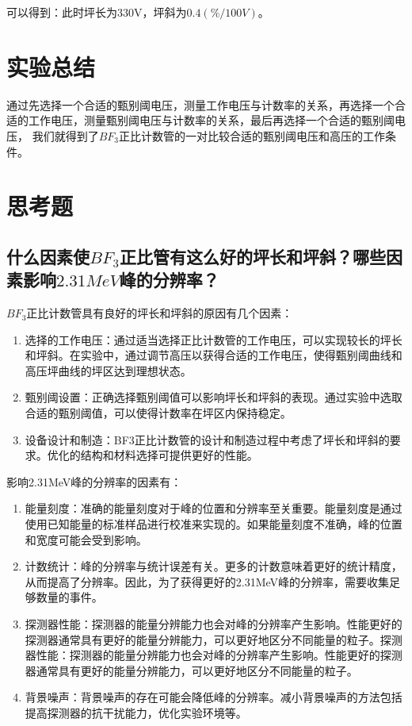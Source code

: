\documentclass[a4paper,UTF8]{ctexart}
\begin{document}
可以得到：此时坪长为330V，坪斜为$0.4(\%/100V)$。

\section{实验总结}

通过先选择一个合适的甄别阈电压，测量工作电压与计数率的关系，再选择一个合适的工作电压，测量甄别阈电压与计数率的关系，最后再选择一个合适的甄别阈电压，
我们就得到了$BF_3$正比计数管的一对比较合适的甄别阈电压和高压的工作条件。

\section{思考题}

\subsection{什么因素使$BF_3$正比管有这么好的坪长和坪斜？哪些因素影响$2.31MeV$峰的分辨率？}

$BF_3$正比计数管具有良好的坪长和坪斜的原因有几个因素：
\begin{enumerate}
    \item 选择的工作电压：通过适当选择正比计数管的工作电压，可以实现较长的坪长和坪斜。在实验中，通过调节高压以获得合适的工作电压，使得甄别阈曲线和高压坪曲线的坪区达到理想状态。
    \item 甄别阈设置：正确选择甄别阈值可以影响坪长和坪斜的表现。通过实验中选取合适的甄别阈值，可以使得计数率在坪区内保持稳定。
    \item 设备设计和制造：BF3正比计数管的设计和制造过程中考虑了坪长和坪斜的要求。优化的结构和材料选择可提供更好的性能。
\end{enumerate}
影响2.31MeV峰的分辨率的因素有：
\begin{enumerate}
    \item 能量刻度：准确的能量刻度对于峰的位置和分辨率至关重要。能量刻度是通过使用已知能量的标准样品进行校准来实现的。如果能量刻度不准确，峰的位置和宽度可能会受到影响。
    \item 计数统计：峰的分辨率与统计误差有关。更多的计数意味着更好的统计精度，从而提高了分辨率。因此，为了获得更好的2.31MeV峰的分辨率，需要收集足够数量的事件。
    \item 探测器性能：探测器的能量分辨能力也会对峰的分辨率产生影响。性能更好的探测器通常具有更好的能量分辨能力，可以更好地区分不同能量的粒子。探测器性能：探测器的能量分辨能力也会对峰的分辨率产生影响。性能更好的探测器通常具有更好的能量分辨能力，可以更好地区分不同能量的粒子。
    \item 背景噪声：背景噪声的存在可能会降低峰的分辨率。减小背景噪声的方法包括提高探测器的抗干扰能力，优化实验环境等。
\end{enumerate}
\end{document}
